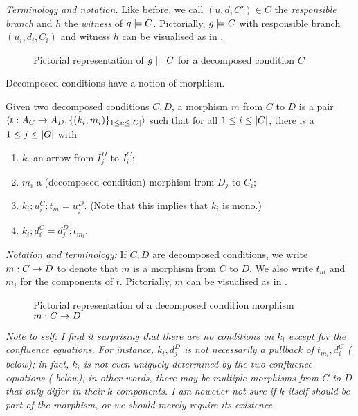 \emph{Terminology and notation.} Like before, we call $(u,d,C')\in C$ the \emph{responsible branch} and $h$ the \emph{witness} of $g\models C$. Pictorially, $g\models C$ with responsible branch $(u_i,d_i,C_i)$ and witness $h$ can be visualised as in .
%
\begin{figure}
  \centering
  
  \caption{Pictorial representation of $g\models C$ for a decomposed condition $C$}
\end{figure}

Decomposed conditions have a notion of morphism.

\begin{definition}
  Given two decomposed conditions $C,D$, a morphism $m$ from $C$ to $D$ is a pair $\langle{t:A_C\rightarrow A_D,\{{(k_i,m_i)}\}_{1\leq u\leq |{C}|}}\rangle$ such that for all $1\leq i\leq |{C}|$, there is a $1\leq j\leq |{G}|$ with
  \begin{enumerate}
  \item $k_i$ an arrow from $I_j^D$ to $I_i^C$;
  \item $m_i$ a (decomposed condition) morphism from $D_j$ to $C_i$;
  \item $k_i;u_i^C;t_m=u_j^D$. (Note that this implies that $k_i$ is mono.)
  \item $k_i;d_i^C=d_j^D;t_{m_i}$.
  \end{enumerate}
\end{definition}
%
\emph{Notation and terminology:} If $C,D$ are decomposed conditions, we write $m:C\rightarrow D$ to denote that $m$ is a morphism from $C$ to $D$. We also write $t_m$ and $m_i$ for the components of $t$. Pictorially, $m$ can be visualised as in .
%
\begin{figure}
  \centering
  
  \caption{Pictorial representation of a decomposed condition morphism $m:C\rightarrow D$}
\end{figure}

\medskip\noindent
\emph{Note to self: I find it surprising that there are no conditions on $k_i$ except for the confluence equations. For instance, $k_i,d_j^D$ is \emph{not} necessarily a pullback of $t_{m_i},d_i^C$ ( below); in fact, $k_i$ is \emph{not even} uniquely determined by the two confluence equations ( below); in other words, there may be multiple morphisms from $C$ to $D$ that only differ in their $k$ components. I am however not sure if $k$ itself should be part of the morphism, or we should merely require its existence.}

